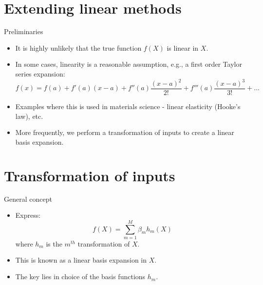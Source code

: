 \documentclass[aspectratio=169]{beamer}
\begin{document}
\section{Extending linear methods}

\begin{frame}{Preliminaries}
    \begin{itemize}
        \item It is highly unlikely that the true function $f(X)$ is linear in $X$.
        \item In some cases, linearity is a reasonable assumption, e.g., a first order Taylor series expansion:
        \begin{equation*}
            f(x) = f(a) + f'(a) (x-a) + f''(a) \frac{(x-a)^2}{2!} + f'''(a) \frac{(x-a)^3}{3!} + ...
        \end{equation*}
        \item Examples where this is used in materials science - linear elasticity (Hooke's law), etc.
        \item More frequently, we perform a transformation of inputs to create a linear basis expansion.
    \end{itemize}
\end{frame}


\section{Transformation of inputs}

\begin{frame}{General concept}
    \begin{itemize}
        \item Express:
        \begin{equation*}
            f(X) = \sum_{m=1}^M \beta_m h_m(X)
        \end{equation*}
        where $h_m$ is the $m^{th}$ transformation of $X$.
        \item This is known as a linear basis expansion in $X$.
        \item The key lies in choice of the basis functions $h_m$.
    \end{itemize}
\end{frame}
\end{document}
